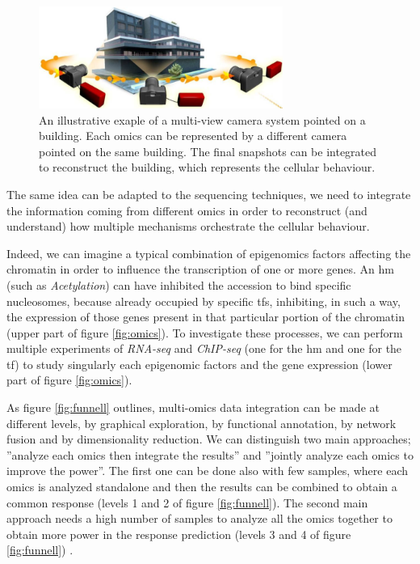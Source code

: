 \begin{figure}[h]
\centering
\includegraphics[width=8cm, keepaspectratio]{img/intro/cameras.png}
\caption[Integration cameras]{An illustrative exaple of a multi-view camera system pointed on a building.
Each omics can be represented by a different camera pointed on the same building. 
The final snapshots can be integrated to reconstruct the building, which represents the cellular behaviour.}
\label{fig:cameras}
\end{figure}

The same idea can be adapted to the sequencing techniques, we need to integrate the information coming from different omics in order to reconstruct (and understand) how multiple mechanisms orchestrate the cellular behaviour.

Indeed, we can imagine a typical combination of epigenomics factors affecting the chromatin in order to influence the transcription of one or more genes.
An \gls{hm} (such as \textit{Acetylation}) can have inhibited the accession to bind specific nucleosomes, because already occupied by specific \glspl{tf}, inhibiting, in such a way, the expression of those genes present in that particular portion of the chromatin (upper part of figure \ref{fig:omics}).
To investigate these processes, we can perform multiple experiments of \textit{RNA-seq} and \textit{ChIP-seq} (one for the \gls{hm} and one for the \gls{tf}) to study singularly each epigenomic factors and the gene expression (lower part of figure \ref{fig:omics}). 

As figure \ref{fig:funnell} outlines, multi-omics data integration can be made at different levels, by graphical exploration, by functional annotation, by network fusion and by dimensionality reduction.
We can distinguish two main approaches; ''analyze each omics then integrate the results'' and ''jointly analyze each omics to improve the power''.
The first one can be done also with few samples, where each omics is analyzed standalone and then the results can be combined to obtain a common response (levels 1 and 2 of figure \ref{fig:funnell}).
The second main approach needs a high number of samples to analyze all the omics together to obtain more power in the response prediction (levels 3 and 4 of figure \ref{fig:funnell}) \cite{Rohart2017, Argelaguet2018, Jia2017, Meng2016}.

